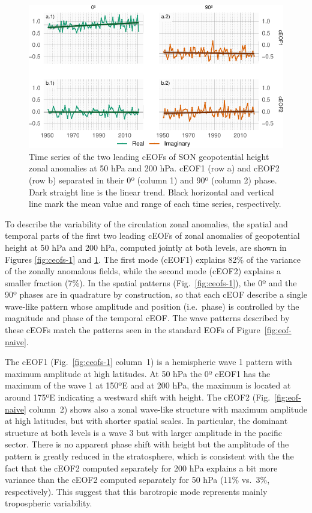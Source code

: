 \documentclass[pdflatex,lineno,sn-basic]{sn-jnl}
\theoremstyle{thmstyleone}%
\theoremstyle{thmstyletwo}%
\theoremstyle{thmstylethree}%
\begin{document}
\begin{figure}
\includegraphics{shceof_files/figure-latex/extended-series-1} \caption{Time series of the two leading cEOFs of SON geopotential height zonal anomalies at 50 hPa and 200 hPa. cEOF1 (row a) and cEOF2 (row b) separated in their 0º (column 1) and 90º (column 2) phase. Dark straight line is the linear trend. Black horizontal and vertical line mark the mean value and range of each time series, respectively.}\label{fig:extended-series}
\end{figure}

To describe the variability of the circulation zonal anomalies, the spatial and temporal parts of the first two leading cEOFs of zonal anomalies of geopotential height at 50 hPa and 200 hPa, computed jointly at both levels, are shown in Figures \ref{fig:ceofs-1} and \ref{fig:extended-series}.
The first mode (cEOF1) explains 82\% of the variance of the zonally anomalous fields, while the second mode (cEOF2) explains a smaller fraction (7\%).
In the spatial patterns (Fig.~\ref{fig:ceofs-1}), the 0º and the 90º phases are in quadrature by construction, so that each cEOF describe a single wave-like pattern whose amplitude and position (i.e.~phase) is controlled by the magnitude and phase of the temporal cEOF.
The wave patterns described by these cEOFs match the patterns seen in the standard EOFs of Figure~\ref{fig:eof-naive}.

The cEOF1 (Fig.~\ref{fig:ceofs-1} column~1) is a hemispheric wave 1 pattern with maximum amplitude at high latitudes.
At 50 hPa the 0º cEOF1 has the maximum of the wave 1 at 150ºE and at 200 hPa, the maximum is located at around 175ºE indicating a westward shift with height.
The cEOF2 (Fig.~\ref{fig:eof-naive} column~2) shows also a zonal wave-like structure with maximum amplitude at high latitudes, but with shorter spatial scales.
In particular, the dominant structure at both levels is a wave 3 but with larger amplitude in the pacific sector.
There is no apparent phase shift with height but the amplitude of the pattern is greatly reduced in the stratosphere, which is consistent with the the fact that the cEOF2 computed separately for 200 hPa explains a bit more variance than the cEOF2 computed separately for 50 hPa (11\% vs.~3\%, respectively).
This suggest that this barotropic mode represents mainly tropospheric variability.
\end{document}
